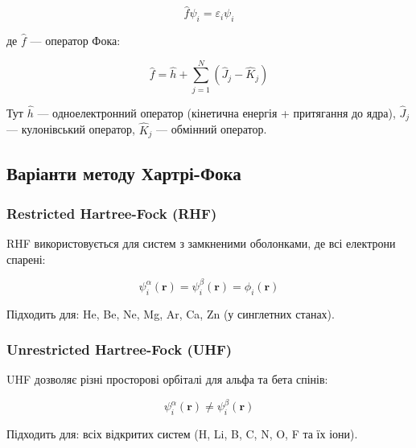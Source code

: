 \begin{equation}
    \hat{f} \psi_i = \varepsilon_i \psi_i
\end{equation}

де $\hat{f}$ --- оператор Фока:

\begin{equation}
    \hat{f} = \hat{h} + \sum_{j=1}^{N} (\hat{J}_j - \hat{K}_j)
\end{equation}

Тут $\hat{h}$ --- одноелектронний оператор (кінетична енергія + притягання до ядра), $\hat{J}_j$ --- кулонівський оператор, $\hat{K}_j$ --- обмінний оператор.

\subsection{Варіанти методу Хартрі-Фока}

\subsubsection{Restricted Hartree-Fock (RHF)}

RHF використовується для систем з замкненими оболонками, де всі електрони спарені:

\begin{equation}
    \psi_i^\alpha(\mathbf{r}) = \psi_i^\beta(\mathbf{r}) = \phi_i(\mathbf{r})
\end{equation}

Підходить для: He, Be, Ne, Mg, Ar, Ca, Zn (у синглетних станах).

\subsubsection{Unrestricted Hartree-Fock (UHF)}

UHF дозволяє різні просторові орбіталі для альфа та бета спінів:

\begin{equation}
    \psi_i^\alpha(\mathbf{r}) \neq \psi_i^\beta(\mathbf{r})
\end{equation}

Підходить для: всіх відкритих систем (H, Li, B, C, N, O, F та їх іони).



